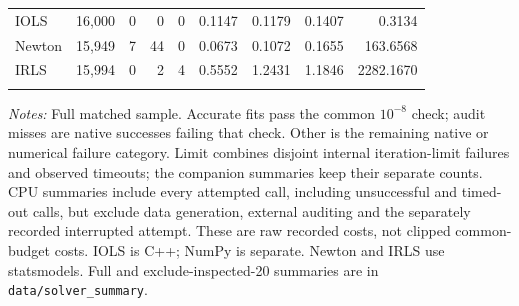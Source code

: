 \begin{table}[p]
\begin{singlespace}
\begin{tabular}{@{}lrrrrrrrr@{}}
IOLS & 16,000 & 0 & 0 & 0 & 0.1147 & 0.1179 & 0.1407 & 0.3134\\
Newton & 15,949 & 7 & 44 & 0 & 0.0673 & 0.1072 & 0.1655 & 163.6568\\
IRLS & 15,994 & 0 & 2 & 4 & 0.5552 & 1.2431 & 1.1846 & 2282.1670\\
\addlinespace[2pt]
\bottomrule
\end{tabular}
\par\smallskip
\begin{minipage}{\linewidth}
\footnotesize\textit{Notes:} Full matched sample. Accurate fits pass the common \(10^{-8}\) check; audit misses are native successes failing that check. Other is the remaining native or numerical failure category. Limit combines disjoint internal iteration-limit failures and observed timeouts; the companion summaries keep their separate counts. CPU summaries include every attempted call, including unsuccessful and timed-out calls, but exclude data generation, external auditing and the separately recorded interrupted attempt. These are raw recorded costs, not clipped common-budget costs. IOLS is C++; NumPy is separate. Newton and IRLS use statsmodels. Full and exclude-inspected-20 summaries are in \texttt{data/solver\_summary}.
\end{minipage}
\end{singlespace}
\end{table}

